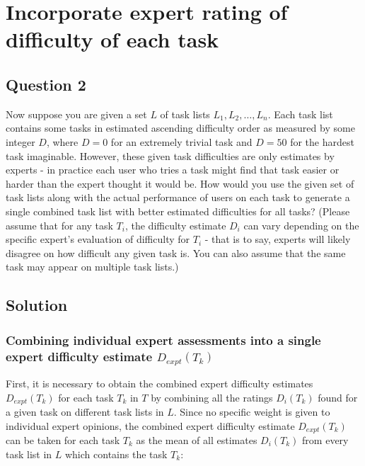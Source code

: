 \chapter{Incorporate expert rating of difficulty of each task} \label{ch:q2_expert_rating}

\section{Question 2} \label{sec:q2}

Now suppose you are given a set $L$ of task lists $L_1, L_2, \dots, L_n$.
Each task list contains some tasks in estimated ascending difficulty order as measured by some integer $D$, where $D = 0$ for an extremely trivial task and $D = 50$ for the hardest task imaginable.
However, these given task difficulties are only estimates by experts - in practice each user who tries a task might find that task easier or harder than the expert thought it would be.
How would you use the given set of task lists along with the actual performance of users on each task to generate a single combined task list with better estimated difficulties for all tasks?
(Please assume that for any task $T_i$, the difficulty estimate $D_i$ can vary depending on the specific expert's evaluation of difficulty for $T_i$ - that is to say, experts will likely disagree on how difficult any given task is.
You can also assume that the same task may appear on multiple task lists.)

\section{Solution} \label{sec:q2_solution}

\subsection{Combining individual expert assessments into a single expert difficulty estimate $D_{expt}(T_k)$} \label{subsec:q2_dexp}

First, it is necessary to obtain the combined expert difficulty estimates $D_{expt}(T_k)$ for each task $T_k$ in $T$ by combining all the ratings $D_i(T_k)$ found for a given task on different task lists in $L$.
Since no specific weight is given to individual expert opinions, the combined expert difficulty estimate $D_{expt}(T_k)$ can be taken for each task $T_k$ as the mean of all estimates $D_i(T_k)$ from every task list in $L$ which contains the task $T_k$:

